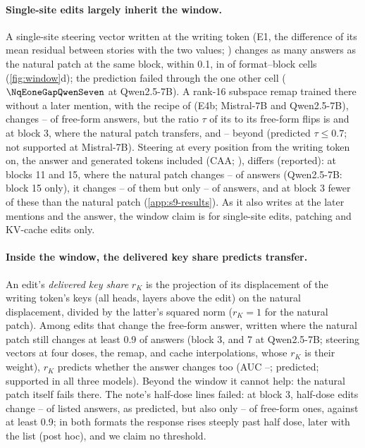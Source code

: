 \paragraph{Single-site edits largely inherit the window.}
A single-site steering vector written at the writing token (E1, the difference of its mean residual between stories with the two values; \citealp{turner2023actadd,panickssery2023caa}) changes as many answers as the natural patch at the same block, within 0.1, in \NqEoneWithinAll{} of \NqEoneCellsAll{} format--block cells (\cref{fig:window}d); the prediction failed through the one other cell ($\NqEoneGapQwenSeven$ at Qwen2.5-7B). A rank-16 subspace remap trained there without a later mention, with the recipe of \citet{anonymous2026fitted} (E4b; Mistral-7B and Qwen2.5-7B), changes \NqEfourbNoneMin--\NqEfourbNoneMax{} of free-form answers, but the ratio $\tau$ of its \fmtListA{} to its free-form flips is \NqTauEfourbThreeMistralSeven{} and \NqTauEfourbThreeQwenSeven{} at block 3, where the natural patch transfers, and \NqTauEfourbBeyondMin--\NqTauEfourbBeyondMax{} beyond (predicted $\tau \leq 0.7$; not supported at Mistral-7B). Steering at every position from the writing token on, the answer and generated tokens included (CAA; \citealp{panickssery2023caa}), differs (reported): at blocks 11 and 15, where the natural patch changes \NqPfivecNatReadMin--\NqPfivecNatReadMax{} of \fmtListA{} answers (Qwen2.5-7B: block 15 only), it changes \NqPfivecCaaMin--\NqPfivecCaaMax{} of them but only \NqEditCaaLetterFifteenQwenSeven--\NqEditCaaLetterFifteenMistralSeven{} of \fmtLetter{} answers, and at block 3 fewer of these than the natural patch (\cref{app:s9-results}). As it also writes at the later mentions and the answer, the window claim is for single-site edits, patching and KV-cache edits only.

\paragraph{Inside the window, the delivered key share predicts transfer.}
An edit's \emph{delivered key share} $r_K$ is the projection of its displacement of the writing token's keys (all heads, layers above the edit) on the natural displacement, divided by the latter's squared norm ($r_K = 1$ for the natural patch). Among edits that change the free-form answer, written where the natural patch still changes at least 0.9 of \fmtListA{} answers (block 3, and 7 at Qwen2.5-7B; steering vectors at four doses, the remap, and cache interpolations, whose $r_K$ is their weight), $r_K$ predicts whether the \fmtListA{} answer changes too (AUC \NqAucMin--\NqAucMax; predicted; supported in all three models). Beyond the window it cannot help: the natural patch itself fails there. The note's half-dose lines failed: at block 3, half-dose edits change \NqHalfAfterMin--\NqHalfAfterMax{} of listed answers, as predicted, but also only \NqHalfNoneMin--\NqHalfNoneMax{} of free-form ones, against at least 0.9; in both formats the response rises steeply past half dose, later with the list (post hoc), and we claim no threshold.

